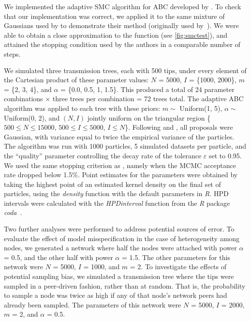 \documentclass[12pt]{article}\usepackage[]{graphicx}\usepackage[]{color}
\newcommand{\software}[1]{\textit{#1}}
\newcommand{\sett}[1]{\{#1\}}
\begin{document}
We implemented the adaptive \gls{SMC} algorithm for \gls{ABC} developed by
\textcite{del2012adaptive}. To check that our implementation was correct, we
applied it to the same mixture of Gaussians used by
\citeauthor{del2012adaptive} to demonstrate their method (originally used
by~\textcite{sisson2007sequential}). We were able to obtain a close
approximation to the function (see \cref{fig:smctest}), and attained the
stopping condition used by the authors in a comparable number of steps.

We simulated three transmission trees, each with 500 tips, under every element
of the Cartesian product of these parameter values: $N$ = 5000, $I$ =
\sett{1000, 2000}, $m$ = \sett{2, 3, 4}, and $\alpha$ = \sett{0.0, 0.5, 1,
1.5}. This produced a total of 24 parameter combinations $\times$ three trees
per combination = 72 trees total. The adaptive \gls{ABC} algorithm was applied
to each tree with these priors: $m \sim$ Uniform(1, 5), $\alpha \sim$
Uniform(0, 2), and $(N, I)$ jointly uniform on the triangular region \{$500
\leq N \leq 15000$, $500 \leq I \leq 5000$, $I \leq N$\}. Following
\textcite{del2012adaptive} and \textcite{beaumont2009adaptive}, all proposals
were Gaussian, with variance equal to twice the empirical variance of the
particles. The algorithm was run with 1000 particles, 5 simulated datasets per
particle, and the ``quality'' parameter controlling the decay rate of the
tolerance $\varepsilon$ set to 0.95. We used the same stopping criterion as
\citeauthor{del2012adaptive}, namely when the \gls{MCMC} acceptance rate
dropped below 1.5\%. Point estimates for the parameters were obtained by taking
the highest point of an estimated kernel density on the final set of particles,
using the \software{density} function with the default parameters in
\software{R}. \gls{HPD} intervals were calculated with the
\software{HPDinterval} function from the \software{R} package
\software{coda}~\autocite{plummer2006coda}.

Two further analyses were performed to address potential sources of error. To
evaluate the effect of model misspecification in the case of heterogeneity
among nodes, we generated a network where half the nodes were attached with
power $\alpha$ = 0.5, and the other half with power $\alpha$ = 1.5. The other
parameters for this network were $N$ = 5000, $I$ = 1000, and $m$ = 2. To
investigate the effects of potential sampling bias, we simulated a transmission
tree where the tips were sampled in a peer-driven fashion, rather than at
random. That is, the probability to sample a node was twice as high if any of
that node's network peers had already been sampled. The parameters of this
network were $N$ = 5000, $I$ = 2000, $m$ = 2, and $\alpha$ = 0.5.
\end{document}
